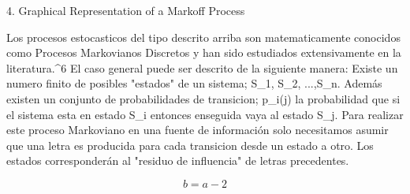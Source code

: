 4. Graphical Representation of a Markoff Process

Los procesos estocasticos del tipo descrito arriba son matematicamente conocidos como Procesos Markovianos Discretos y han sido estudiados extensivamente en la literatura.^{6} El caso general puede ser descrito de la siguiente manera: Existe un numero finito de posibles "estados" de un sistema; S_{1}, S_{2}, ...,S_{n}. Adem\'{a}s existen un conjunto de probabilidades de transicion; p_{i}(j) la probabilidad que si el sistema esta en estado S_{i} entonces enseguida vaya al estado S_{j}. Para realizar este proceso Markoviano en una fuente de información solo necesitamos asumir que una letra es producida para cada transicion desde un estado a otro. Los estados corresponderán al "residuo de influencia" de letras precedentes.

\begin{equation}
b = a - 2
\end{equation}
